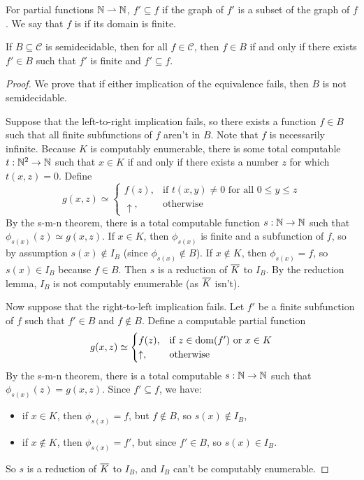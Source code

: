\begin{definition}
  For partial functions $\mathbb{N} \rightharpoonup \mathbb{N}$, $f' \subseteq f$ if the graph
  of $f'$ is a subset of the graph of $f$.
  We say that $f$ is  if its domain is finite.
\end{definition}

\begin{theorem}
  If $B \subseteq \mathcal{C}$ is semidecidable, then for all $f \in
  \mathcal{C}$, then $f \in B$ if and only if there exists $f' \in B$ such that
  $f'$ is finite and $f' \subseteq f$.
\end{theorem}

\begin{proof}
  We prove that if either implication of the equivalence fails, then $B$ is not
  semidecidable.

  Suppose that the left-to-right implication fails, so there exists a function
  $f \in B$ such that all finite subfunctions of $f$ aren't in $B$.
  Note that $f$ is necessarily infinite.
  Because $K$ is computably enumerable, there is some total computable $t: \mathbb{N}^2
  \to \mathbb{N}$ such that $x \in K$ if and only if there exists a number $z$ for which
  $t(x,z) = 0$.
  Define
  \[
	g(x,z) \simeq
	\begin{cases}
	  f(z), & \text{if $t(x,y) \ne 0$ for all $0 \le y \le z$} \\
	  \uparrow, & \text{otherwise}
	\end{cases}
  \]
  By the s-m-n theorem, there is a total computable function $s: \mathbb{N} \to \mathbb{N}$ such
  that $\phi_{s(x)}(z) \simeq g(x,z)$.
  If $x \in K$, then $\phi_{s(x)}$ is finite and a subfunction of $f$, so by
  assumption $s(x) \notin I_B$ (since $\phi_{s(x)} \notin B$).
  If $x \notin K$, then $\phi_{s(x)} = f$, so $s(x) \in I_B$ because $f \in B$.
  Then $s$ is a reduction of $\overline{K}$ to $I_B$.
  By the reduction lemma, $I_B$ is not computably enumerable (as $\overline{K}$
  isn't).

  Now suppose that the right-to-left implication fails.
  Let $f'$ be a finite subfunction of $f$ such that $f' \in B$ and $f \notin B$.
  Define a computable partial function
  \[
	g(x,z) \simeq
	\begin{cases}
	  f(z), & \text{if $z \in \operatorname{dom}(f')$ or $x \in K$} \\
	  \uparrow, & \text{otherwise}
	\end{cases}
  \]
  By the s-m-n theorem, there is a total computable $s: \mathbb{N} \to \mathbb{N}$ such that
  $\phi_{s(x)}(z) = g(x,z)$.
  Since $f' \subseteq f$, we have:
  \begin{itemize}
  \item if $x \in K$, then $\phi_{s(x)} = f$, but $f \notin B$, so $s(x) \notin
	I_B$,
  \item if $x \notin K$, then $\phi_{s(x)} = f'$, but since $f' \in B$, so $s(x)
	\in I_B$.
  \end{itemize}
  So $s$ is a reduction of $\overline{K}$ to $I_B$, and $I_B$ can't be computably
  enumerable.
\end{proof}

